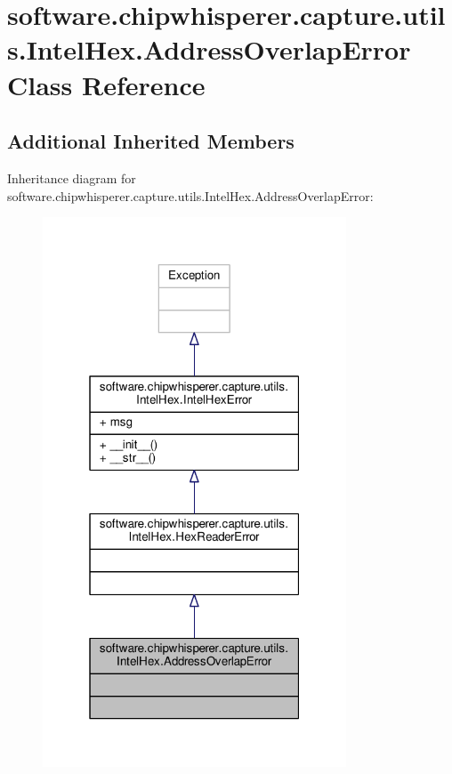 \hypertarget{classsoftware_1_1chipwhisperer_1_1capture_1_1utils_1_1IntelHex_1_1AddressOverlapError}{}\section{software.\+chipwhisperer.\+capture.\+utils.\+Intel\+Hex.\+Address\+Overlap\+Error Class Reference}
\label{classsoftware_1_1chipwhisperer_1_1capture_1_1utils_1_1IntelHex_1_1AddressOverlapError}
\subsection*{Additional Inherited Members}


Inheritance diagram for software.\+chipwhisperer.\+capture.\+utils.\+Intel\+Hex.\+Address\+Overlap\+Error\+:\nopagebreak
\begin{figure}[H]
\begin{center}
\leavevmode
\includegraphics[width=256pt]{d2/db0/classsoftware_1_1chipwhisperer_1_1capture_1_1utils_1_1IntelHex_1_1AddressOverlapError__inherit__graph}
\end{center}
\end{figure}


